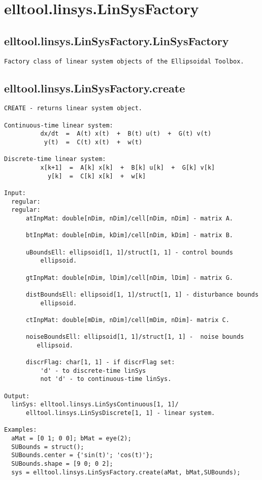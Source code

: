 \section{elltool.linsys.LinSysFactory}\label{secClassDescr:elltool.linsys.LinSysFactory}
\subsection{\texorpdfstring{elltool.linsys.LinSysFactory.LinSysFactory}{LinSysFactory}}\label{method:elltool.linsys.LinSysFactory.LinSysFactory}
\begin{verbatim}
Factory class of linear system objects of the Ellipsoidal Toolbox.
\end{verbatim}
\subsection{\texorpdfstring{elltool.linsys.LinSysFactory.create}{create}}\label{method:elltool.linsys.LinSysFactory.create}
\begin{verbatim}
CREATE - returns linear system object.

Continuous-time linear system:
          dx/dt  =  A(t) x(t)  +  B(t) u(t)  +  G(t) v(t)
           y(t)  =  C(t) x(t)  +  w(t)

Discrete-time linear system:
          x[k+1]  =  A[k] x[k]  +  B[k] u[k]  +  G[k] v[k]
            y[k]  =  C[k] x[k]  +  w[k]

Input:
  regular:
  regular:
      atInpMat: double[nDim, nDim]/cell[nDim, nDim] - matrix A.

      btInpMat: double[nDim, kDim]/cell[nDim, kDim] - matrix B.

      uBoundsEll: ellipsoid[1, 1]/struct[1, 1] - control bounds
          ellipsoid.

      gtInpMat: double[nDim, lDim]/cell[nDim, lDim] - matrix G.

      distBoundsEll: ellipsoid[1, 1]/struct[1, 1] - disturbance bounds
          ellipsoid.

      ctInpMat: double[mDim, nDim]/cell[mDim, nDim]- matrix C.

      noiseBoundsEll: ellipsoid[1, 1]/struct[1, 1] -  noise bounds
         ellipsoid.

      discrFlag: char[1, 1] - if discrFlag set:
          'd' - to discrete-time linSys
          not 'd' - to continuous-time linSys.

Output:
  linSys: elltool.linsys.LinSysContinuous[1, 1]/
      elltool.linsys.LinSysDiscrete[1, 1] - linear system.

Examples:
  aMat = [0 1; 0 0]; bMat = eye(2);
  SUBounds = struct();
  SUBounds.center = {'sin(t)'; 'cos(t)'};
  SUBounds.shape = [9 0; 0 2];
  sys = elltool.linsys.LinSysFactory.create(aMat, bMat,SUBounds);
\end{verbatim}
